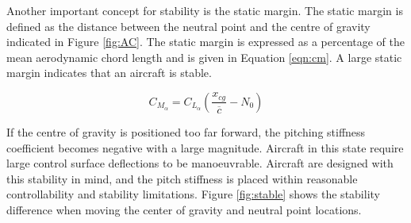 Another important concept for stability is the static margin. The static margin is defined as the distance between the neutral point and the centre of gravity indicated in Figure \ref{fig:AC}. The static margin is expressed as a percentage of the mean aerodynamic chord length and is given in Equation \ref{eqn:cm}. A large static margin indicates that an aircraft is stable. 

\begin{equation}
    C_{M_\alpha} = C_{L_\alpha} ( \frac{x_{cg}}{\overline{c}} - N_0 )
    \label{eqn:cm}
\end{equation}

If the centre of gravity is positioned too far forward, the pitching stiffness coefficient becomes negative with a large magnitude. Aircraft in this state require large control surface deflections to be manoeuvrable. Aircraft are designed with this stability in mind, and the pitch stiffness is placed within reasonable controllability and stability limitations. Figure \ref{fig:stable} shows the stability difference when moving the center of gravity and neutral point locations. 


